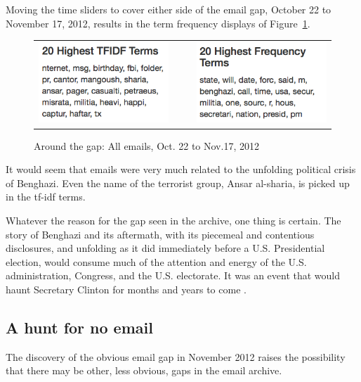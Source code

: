 \documentclass[journal]{vgtc}                %
\begin{document}
Moving the time sliders to cover either side of the email gap, October 22 to November 17, 2012, results in  the term frequency displays of Figure~\ref{fig:TermFreqOct22Nov17_2012}.
\begin{figure}[h]
\begin{center}
\begin{tabular}{ccc}
\includegraphics[width=0.4\linewidth]{TFIDFOct22Nov17_2012} &
$~~~~$ &
\includegraphics[width=0.4\linewidth]{TermFreqOct22Nov17_2012} 
\end{tabular}
\caption{Around the gap: All emails, Oct. 22 to Nov.17, 2012}
\label{fig:TermFreqOct22Nov17_2012}
\end{center}
\end{figure}
It would seem that emails were very much related to the unfolding political crisis of Benghazi.  Even the name of the terrorist group, Ansar al-sharia, is picked up in the tf-idf terms.

Whatever the reason for the gap seen in the archive, one thing is certain.
The story of Benghazi and its aftermath, with its piecemeal and contentious disclosures, and unfolding as it did immediately before a U.S. Presidential election, would consume much of the attention and energy of the U.S. administration, Congress, and the U.S. electorate.  It was an event that would haunt Secretary Clinton for months and years  to come \cite{benghaziTimelineWikipedia}.

\subsection{A hunt for no email}
\label{sect:emailZeros}
The discovery of the obvious email gap in November 2012 raises the possibility that there may be other, less obvious, gaps in the email archive.  
\end{document}
